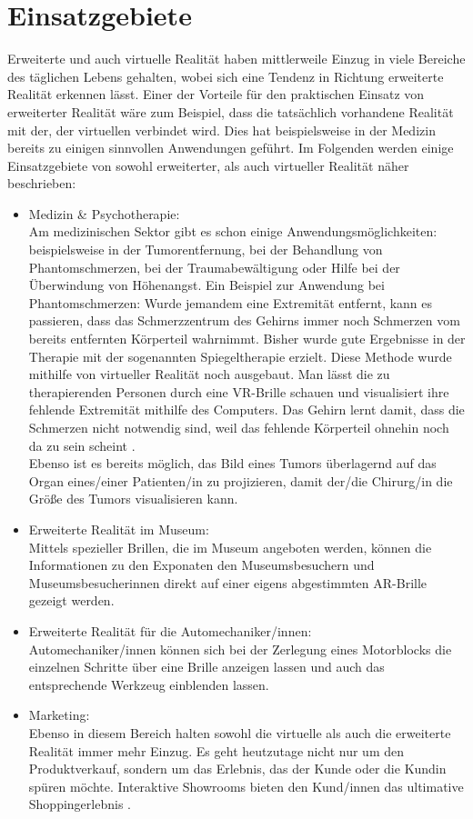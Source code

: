 \documentclass[deutsch]{llncs}
\begin{document}
\section{Einsatzgebiete}
Erweiterte und auch virtuelle Realität haben mittlerweile Einzug in viele Bereiche des täglichen Lebens gehalten, wobei sich eine Tendenz in Richtung erweiterte Realität erkennen lässt. Einer der Vorteile für den praktischen Einsatz von erweiterter Realität wäre zum Beispiel, dass die tatsächlich vorhandene Realität mit der, der virtuellen verbindet wird. Dies hat beispielsweise in der Medizin bereits zu einigen sinnvollen Anwendungen geführt. Im Folgenden werden einige Einsatzgebiete von sowohl erweiterter, als auch virtueller Realität näher beschrieben: 
\begin{itemize}
\item Medizin \& Psychotherapie:\\
Am medizinischen Sektor gibt es schon einige Anwendungsmöglichkeiten: beispielsweise in der Tumorentfernung, bei der Behandlung von Phantomschmerzen, bei der Traumabewältigung oder Hilfe bei der Überwindung von Höhenangst. 
Ein Beispiel zur Anwendung bei Phantomschmerzen: Wurde jemandem eine Extremität entfernt, kann es passieren, dass das Schmerzzentrum des Gehirns immer noch Schmerzen vom bereits entfernten Körperteil wahrnimmt. Bisher wurde gute Ergebnisse in der Therapie mit der sogenannten Spiegeltherapie erzielt. Diese Methode wurde mithilfe von virtueller Realität noch ausgebaut. Man lässt die zu therapierenden Personen durch eine VR-Brille schauen und visualisiert ihre fehlende Extremität mithilfe des Computers. Das Gehirn lernt damit, dass die Schmerzen nicht notwendig sind, weil das fehlende Körperteil ohnehin noch da zu sein scheint \cite{}. \\
Ebenso ist es bereits möglich, das Bild eines Tumors überlagernd auf das Organ eines/einer Patienten/in zu projizieren, damit der/die Chirurg/in die Größe des Tumors visualisieren kann.
\item Erweiterte Realität im Museum: \\
Mittels spezieller Brillen, die im Museum angeboten werden, können die Informationen zu den Exponaten den Museumsbesuchern und Museumsbesucherinnen direkt auf einer eigens abgestimmten AR-Brille gezeigt werden. 
\item Erweiterte Realität für die Automechaniker/innen:\\
Automechaniker/innen können sich bei der Zerlegung eines Motorblocks die einzelnen Schritte über eine Brille anzeigen lassen und auch das entsprechende Werkzeug einblenden lassen. 
\item Marketing: \\
Ebenso in diesem Bereich halten sowohl die virtuelle als auch die erweiterte Realität immer mehr Einzug. Es geht heutzutage nicht nur um den Produktverkauf, sondern um das Erlebnis, das der Kunde oder die Kundin spüren möchte. Interaktive Showrooms bieten den Kund/innen das ultimative Shoppingerlebnis \cite{}.

\end{itemize}
\end{document}
